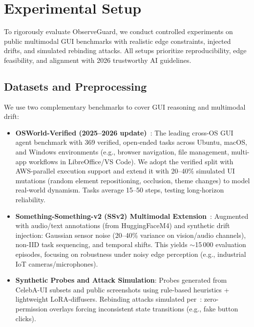 \section{Experimental Setup}

To rigorously evaluate ObserveGuard, we conduct controlled experiments on public multimodal GUI benchmarks with realistic edge constraints, injected drifts, and simulated rebinding attacks. All setups prioritize reproducibility, edge feasibility, and alignment with 2026 trustworthy AI guidelines.

\subsection{Datasets and Preprocessing}
We use two complementary benchmarks to cover GUI reasoning and multimodal drift:

\begin{itemize}
    \item \textbf{OSWorld-Verified (2025--2026 update)}~\cite{xie2024osworld, osworldgithub2025, mobileagentv35}: The leading cross-OS GUI agent benchmark with 369 verified, open-ended tasks across Ubuntu, macOS, and Windows environments (e.g., browser navigation, file management, multi-app workflows in LibreOffice/VS Code). We adopt the verified split with AWS-parallel execution support and extend it with 20--40\% simulated UI mutations (random element repositioning, occlusion, theme changes) to model real-world dynamism. Tasks average 15--50 steps, testing long-horizon reliability.
    
    \item \textbf{Something-Something-v2 (SSv2) Multimodal Extension}~\cite{goyal2017somethingsomething, huggingface2025ssv2}: Augmented with audio/text annotations (from HuggingFaceM4) and synthetic drift injection: Gaussian sensor noise (20--40\% variance on vision/audio channels), non-IID task sequencing, and temporal shifts. This yields $\sim$15\,000 evaluation episodes, focusing on robustness under noisy edge perception (e.g., industrial IoT cameras/microphones).
    
    \item \textbf{Synthetic Probes and Attack Simulation}: Probes generated from CelebA-UI subsets and public screenshots using rule-based heuristics + lightweight LoRA-diffusers. Rebinding attacks simulated per~\cite{qian2026rebinding, riosworld2025}: zero-permission overlays forcing inconsistent state transitions (e.g., fake button clicks).
\end{itemize}


